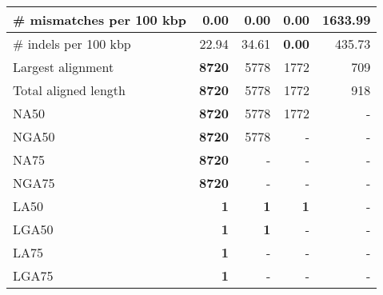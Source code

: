 \documentclass[12pt,a4paper]{article}
\begin{document}
\begin{table}[ht]
\begin{center}
\begin{tabular}{|l*{4}{|r}|}
\# mismatches per 100 kbp & {\bf 0.00} & {\bf 0.00} & {\bf 0.00} & 1633.99 \\ \hline
\# indels per 100 kbp & 22.94 & 34.61 & {\bf 0.00} & 435.73 \\ \hline
Largest alignment & {\bf 8720} & 5778 & 1772 & 709 \\ \hline
Total aligned length & {\bf 8720} & 5778 & 1772 & 918 \\ \hline
NA50 & {\bf 8720} & 5778 & 1772 & - \\ \hline
NGA50 & {\bf 8720} & 5778 & - & - \\ \hline
NA75 & {\bf 8720} & - & - & - \\ \hline
NGA75 & {\bf 8720} & - & - & - \\ \hline
LA50 & {\bf 1} & {\bf 1} & {\bf 1} & - \\ \hline
LGA50 & {\bf 1} & {\bf 1} & - & - \\ \hline
LA75 & {\bf 1} & - & - & - \\ \hline
LGA75 & {\bf 1} & - & - & - \\ \hline
\end{tabular}
\end{center}
\end{table}
\end{document}
